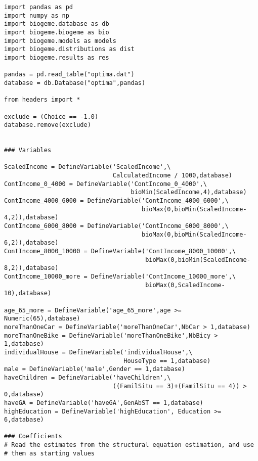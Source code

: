 \documentclass[12pt,a4paper]{article}
\begin{document}
\begin{lstlisting}[style=numbers]
import pandas as pd
import numpy as np
import biogeme.database as db
import biogeme.biogeme as bio
import biogeme.models as models
import biogeme.distributions as dist
import biogeme.results as res

pandas = pd.read_table("optima.dat")
database = db.Database("optima",pandas)

from headers import *

exclude = (Choice == -1.0)
database.remove(exclude)


### Variables

ScaledIncome = DefineVariable('ScaledIncome',\
                              CalculatedIncome / 1000,database)
ContIncome_0_4000 = DefineVariable('ContIncome_0_4000',\
                                   bioMin(ScaledIncome,4),database)
ContIncome_4000_6000 = DefineVariable('ContIncome_4000_6000',\
                                      bioMax(0,bioMin(ScaledIncome-4,2)),database)
ContIncome_6000_8000 = DefineVariable('ContIncome_6000_8000',\
                                      bioMax(0,bioMin(ScaledIncome-6,2)),database)
ContIncome_8000_10000 = DefineVariable('ContIncome_8000_10000',\
                                       bioMax(0,bioMin(ScaledIncome-8,2)),database)
ContIncome_10000_more = DefineVariable('ContIncome_10000_more',\
                                       bioMax(0,ScaledIncome-10),database)

age_65_more = DefineVariable('age_65_more',age >= Numeric(65),database)
moreThanOneCar = DefineVariable('moreThanOneCar',NbCar > 1,database)
moreThanOneBike = DefineVariable('moreThanOneBike',NbBicy > 1,database)
individualHouse = DefineVariable('individualHouse',\
                                 HouseType == 1,database)
male = DefineVariable('male',Gender == 1,database)
haveChildren = DefineVariable('haveChildren',\
                              ((FamilSitu == 3)+(FamilSitu == 4)) > 0,database)
haveGA = DefineVariable('haveGA',GenAbST == 1,database)
highEducation = DefineVariable('highEducation', Education >= 6,database)

### Coefficients
# Read the estimates from the structural equation estimation, and use
# them as starting values


\end{lstlisting}
\end{document}
